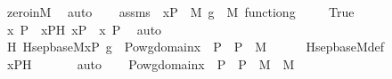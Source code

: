 \begin{isabellebody}
\ zero{\isacharunderscore}{\kern0pt}in{\isacharunderscore}{\kern0pt}M\ \isamarkupfalse%
\ auto\isanewline
{}\isamarkupfalse%
\isanewline
\ \ \isamarkupfalse%
\ assms\ {\isacharcolon}{\kern0pt}\ {\isachardoublequoteopen}xP\ {\isasymin}\ M{\isachardoublequoteclose}\ {\isachardoublequoteopen}g\ {\isasymin}\ M{\isachardoublequoteclose}\ {\isachardoublequoteopen}function{\isacharparenleft}{\kern0pt}g{\isacharparenright}{\kern0pt}{\isachardoublequoteclose}\ \isanewline
\isanewline
\ \ \isamarkupfalse%
\ True\isanewline
\ \ \isamarkupfalse%
\ \isamarkupfalse%
\ x\ P\ \ xPH{\isacharcolon}{\kern0pt}\ {\isachardoublequoteopen}xP\ {\isacharequal}{\kern0pt}\ {\isacharless}{\kern0pt}x{\isacharcomma}{\kern0pt}\ P{\isachargreater}{\kern0pt}{\isachardoublequoteclose}\ \isamarkupfalse%
\ auto\ \isanewline
\isanewline
\ \ \isamarkupfalse%
\ H{\isacharcolon}{\kern0pt}\ {\isachardoublequoteopen}Hsep{\isacharunderscore}{\kern0pt}base{\isacharunderscore}{\kern0pt}M{\isacharparenleft}{\kern0pt}xP{\isacharcomma}{\kern0pt}\ g{\isacharparenright}{\kern0pt}\ {\isacharequal}{\kern0pt}\ Pow{\isacharparenleft}{\kern0pt}{\isacharparenleft}{\kern0pt}{\isasymUnion}{\isacharparenleft}{\kern0pt}g{\isacharbackquote}{\kern0pt}{\isacharbackquote}{\kern0pt}{\isacharparenleft}{\kern0pt}domain{\isacharparenleft}{\kern0pt}x{\isacharparenright}{\kern0pt}\ {\isasymtimes}\ {\isacharbraceleft}{\kern0pt}P{\isacharbraceright}{\kern0pt}{\isacharparenright}{\kern0pt}{\isacharparenright}{\kern0pt}{\isacharparenright}{\kern0pt}\ {\isasymtimes}\ P{\isacharparenright}{\kern0pt}\ {\isasyminter}\ M{\isachardoublequoteclose}\isanewline
\ \ \ \ \isamarkupfalse%
\ Hsep{\isacharunderscore}{\kern0pt}base{\isacharunderscore}{\kern0pt}M{\isacharunderscore}{\kern0pt}def\ \isanewline
\ \ \ \ \isamarkupfalse%
\ xPH\ \isanewline
\ \ \ \ \isamarkupfalse%
\ auto\isanewline
\isanewline
\ \ \isamarkupfalse%
\ {\isachardoublequoteopen}Pow{\isacharparenleft}{\kern0pt}{\isacharparenleft}{\kern0pt}{\isasymUnion}{\isacharparenleft}{\kern0pt}g{\isacharbackquote}{\kern0pt}{\isacharbackquote}{\kern0pt}{\isacharparenleft}{\kern0pt}domain{\isacharparenleft}{\kern0pt}x{\isacharparenright}{\kern0pt}\ {\isasymtimes}\ {\isacharbraceleft}{\kern0pt}P{\isacharbraceright}{\kern0pt}{\isacharparenright}{\kern0pt}{\isacharparenright}{\kern0pt}{\isacharparenright}{\kern0pt}\ {\isasymtimes}\ P{\isacharparenright}{\kern0pt}\ {\isasyminter}\ M\ {\isasymin}\ M{\isachardoublequoteclose}\ \isanewline

\end{isabellebody}
